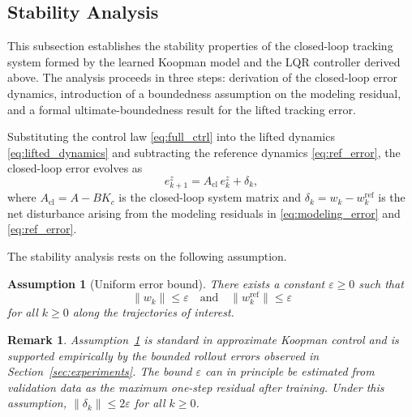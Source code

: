 \documentclass[journal]{IEEEtran}
\newtheorem{assumption}{Assumption}
\newtheorem{remark}{Remark}
\begin{document}
\subsection{Stability Analysis}
\label{subsec:stability}

This subsection establishes the stability properties of the closed-loop tracking system formed by the learned Koopman model and the LQR controller derived above. The analysis proceeds in three steps: derivation of the closed-loop error dynamics, introduction of a boundedness assumption on the modeling residual, and a formal ultimate-boundedness result for the lifted tracking error.

Substituting the control law \eqref{eq:full_ctrl} into the lifted dynamics \eqref{eq:lifted_dynamics} and subtracting the reference dynamics \eqref{eq:ref_error}, the closed-loop error evolves as
\begin{equation}
    e_{k+1}^z = A_{\mathrm{cl}}\, e_k^z + \delta_k,
    \label{eq:cl_error_dyn}
\end{equation}
where $A_{\mathrm{cl}} = A - BK_c$ is the closed-loop system matrix and $\delta_k = w_k - w_k^{\mathrm{ref}}$ is the net disturbance arising from the modeling residuals in \eqref{eq:modeling_error} and \eqref{eq:ref_error}.

The stability analysis rests on the following assumption.

\begin{assumption}[Uniform error bound]
\label{assump:bound}
There exists a constant $\varepsilon \geq 0$ such that
\begin{equation}
    \|w_k\| \leq \varepsilon \quad \text{and} \quad \|w_k^{\mathrm{ref}}\| \leq \varepsilon
    \label{eq:error_bound}
\end{equation}
for all $k \geq 0$ along the trajectories of interest.
\end{assumption}

\begin{remark}
Assumption~\ref{assump:bound} is standard in approximate Koopman control \cite{strasser2026overview} and is supported empirically by the bounded rollout errors observed in Section~\ref{sec:experiments}. The bound $\varepsilon$ can in principle be estimated from validation data as the maximum one-step residual after training. Under this assumption, $\|\delta_k\| \leq 2\varepsilon$ for all $k \geq 0$.
\end{remark}
\end{document}
